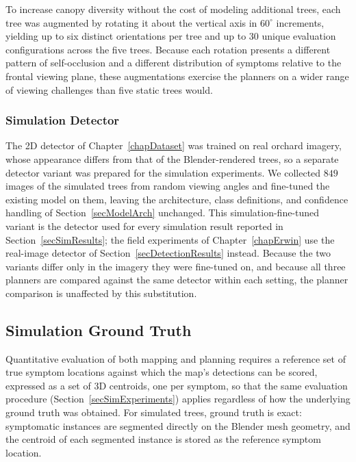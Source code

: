 To increase canopy diversity without the cost of modeling additional trees,
each tree was augmented by rotating it about the vertical axis in
$60^\circ$ increments, yielding up to six distinct orientations per tree
and up to $30$ unique evaluation configurations across the five trees.
Because each rotation presents a different pattern of self-occlusion and a
different distribution of symptoms relative to the frontal viewing plane,
these augmentations exercise the planners on a wider range of
viewing challenges than five static trees would.

\subsubsection{Simulation Detector} \label{secSimDetector}

The 2D detector of Chapter~\ref{chapDataset} was trained on real orchard
imagery, whose appearance differs from that of the Blender-rendered trees, so a
separate detector variant was prepared for the simulation experiments.
We collected $849$ images of the simulated trees from random viewing angles and
fine-tuned the existing model on them, leaving the architecture, class
definitions, and confidence handling of Section~\ref{secModelArch} unchanged.
This simulation-fine-tuned variant is the detector used for every simulation
result reported in Section~\ref{secSimResults}; the field experiments of
Chapter~\ref{chapErwin} use the real-image detector of
Section~\ref{secDetectionResults} instead.
Because the two variants differ only in the imagery they were fine-tuned on,
and because all three planners are compared against the same detector within
each setting, the planner comparison is unaffected by this substitution.

\subsection{Simulation Ground Truth} \label{secSimGT}

Quantitative evaluation of both mapping and planning requires a reference
set of true symptom locations against which the map's detections can be
scored, expressed as a set of 3D centroids, one per symptom, so that the
same evaluation procedure (Section~\ref{secSimExperiments}) applies
regardless of how the underlying ground truth was obtained.
For simulated trees, ground truth is exact: symptomatic instances are
segmented directly on the Blender mesh geometry, and the centroid of each
segmented instance is stored as the reference symptom location.

